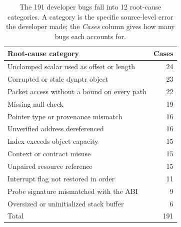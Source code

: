 \begin{table}[t]
  \centering
  \caption{The 191 developer bugs fall into 12 root-cause categories. A category is the specific source-level error the developer made; the \emph{Cases} column gives how many bugs each accounts for.}
  \label{tab:mechanisms}
  \small
  \begin{tabular}{@{}l r@{}}
    \toprule
    Root-cause category & Cases \\
    \midrule
    Unclamped scalar used as offset or length   & 24 \\
    Corrupted or stale dynptr object            & 23 \\
    Packet access without a bound on every path  & 22 \\
    Missing null check                           & 19 \\
    Pointer type or provenance mismatch          & 16 \\
    Unverified address dereferenced              & 16 \\
    Index exceeds object capacity                & 15 \\
    Context or contract misuse                   & 15 \\
    Unpaired resource reference                  & 15 \\
    Interrupt flag not restored in order         & 11 \\
    Probe signature mismatched with the ABI      & 9  \\
    Oversized or uninitialized stack buffer      & 6  \\
    \midrule
    Total                                        & 191 \\
    \bottomrule
  \end{tabular}
\end{table}